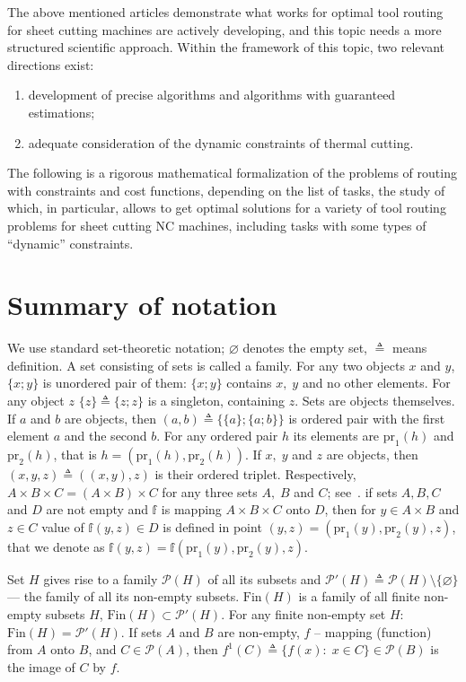 \documentclass[numbers,sort&compress]{IntechOpen-Book}%
\begin{document}
The above mentioned articles demonstrate
what works for optimal tool routing for
sheet cutting machines are actively developing,
and this topic needs a more structured scientific approach.
Within the framework of this topic, two relevant
directions exist:

\begin{enumerate}
  \item
  development of precise algorithms and algorithms with
  guaranteed estimations;
  \item
  adequate consideration of the dynamic constraints of thermal cutting.
\end{enumerate}

The following is a rigorous mathematical formalization
of the
problems of routing
with constraints and cost functions,
depending on the list of tasks,
the study of which, in particular,
allows to get optimal solutions for a variety of
tool routing problems
for sheet cutting NC machines,
including tasks with some types of
``dynamic'' constraints.

\section{Summary of notation}
\label{sec:1}

We use standard set-theoretic notation;
$\varnothing$ denotes the empty set,
${\triangleq}$ means definition.
A set consisting of sets
is called a family.
For any two objects $x$
and $y$,
$\{x;y\}$
is unordered pair of them:
$\{x;y\}$ contains $x,\;y$
and no other elements.
For any object $z$
$\{z\} {\triangleq} \{z;z\}$
is a singleton, containing
$z$.
Sets are objects themselves.
If $a$ and $b$ are objects, then
\cite[~67]{15}
$(a,b) {\triangleq} \{\{a\};\{a;b\}\}$
is ordered pair with
the first element $a$
and the second $b$.
For any ordered pair $h$
its elements are
$\mathrm{pr}_1(h)$
and
$\mathrm{pr}_2(h)$,
that is
$h = (\mathrm{pr} _1(h),\mathrm{pr} _2(h))$.
If $x,\;y$ and $z$ are objects,
then
$(x,y,z) {\triangleq} ((x,y),z)$
is their ordered triplet.
Respectively,
$A \times B \times C = (A \times B) \times C$
for any three sets
$A,\;B$ and $C$;
see~\cite[17]{16}.
if sets
$A, B, C$
and
$D$
are not empty and
$\mathbb{f}$
is mapping
$A\times B\times C$ onto $D$,
then for
$y \in A\times B$
and
$z \in C$
value of
$\mathbb f(y,z)\in D$
is defined in point
$(y,z) = (\mathrm{pr}_1(y), \mathrm{pr}_2(y), z)$,
that we denote as
$\mathbb f(y,z) = \mathbb f(\mathrm{pr}_1(y), \mathrm{pr}_2(y), z)$.

Set $H$
gives rise to a family $\mathcal{P}(H)$
of all its subsets
and $\mathcal{P}'(H) {\triangleq}
\mathcal{P}(H) \setminus \{\varnothing\}$
--- the family of all its non-empty subsets.
$\mathrm{Fin}(H)$
is a family of all finite
non-empty subsets
$H$,
$\mathrm{Fin}(H) \subset \mathcal{P}'(H)$.
For any finite non-empty set
$H$:
$\mathrm{Fin}(H) = \mathcal{P}'(H)$.
If sets $A$ and $B$ are non-empty,
$f$ -- mapping (function) from $A$ onto $B$,
and $C \in \mathcal{P}(A)$,
then
$f^1(C) {\triangleq} \{f(x):\;x \in C\} \in \mathcal{P}(B)$
is the image of $C$ by $f$.
\end{document}
